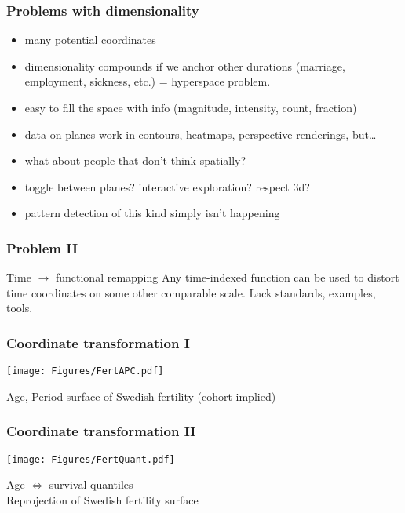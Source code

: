 \documentclass[20pt]{beamer}
\begin{document}

\begin{frame}
\frametitle{Problems with dimensionality}
\begin{itemize}[<+->]
  \item many potential coordinates
  \item dimensionality compounds if we anchor other durations (marriage,
  employment, sickness, etc.) = hyperspace problem.
  \item easy to fill the space with info (magnitude, intensity, count, fraction)
  \item data on planes work in contours, heatmaps, perspective renderings, but\ldots
  \item what about people that don't think spatially?
  \item toggle between planes? interactive exploration? respect 3d?
  \item pattern detection of this kind simply isn't happening
\end{itemize}
\end{frame}


\begin{frame}
\frametitle{Problem II}
\begin{block}{Time $\rightarrow$ functional remapping}
Any time-indexed function can be used to distort time coordinates on some other
comparable scale. Lack standards, examples, tools.
\end{block}
\end{frame}


\begin{frame}
\frametitle{Coordinate transformation I}
\vspace{-4em}
\begin{center}
\texttt{[image: Figures/FertAPC.pdf]}
\end{center}
Age, Period surface of Swedish fertility (cohort implied)
\end{frame}


\begin{frame}
\frametitle{Coordinate transformation II}
\vspace{-4em}
\begin{center}
\texttt{[image: Figures/FertQuant.pdf]}
\end{center}
Age $\Leftrightarrow$ survival quantiles\\
Reprojection of Swedish fertility surface
\end{frame}
\end{document}
